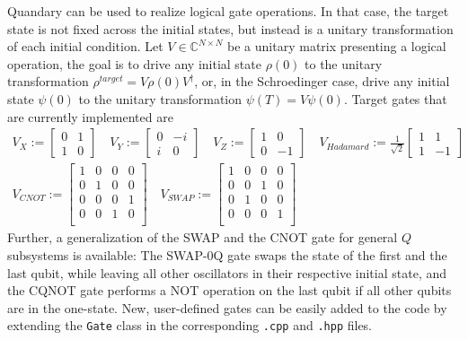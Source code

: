\documentclass[11pt]{article}
\newcommand{\C}{\mathds{C}}
\begin{document}
Quandary can be used to realize logical gate operations. In that case, the target state is not fixed across the initial states, but instead is a unitary transformation of each initial condition. Let $V\in \C^{N\times N}$ be a unitary matrix presenting a logical operation, the goal is to drive any initial state $\rho(0)$ to the unitary transformation $\rho^{target} = V\rho(0)V^{\dagger}$, or, in the Schroedinger case, drive any initial state $\psi(0)$ to the unitary transformation $\psi(T) =  V\psi(0)$.
Target gates that are currently implemented are
\begin{align}
  V_{X} := \begin{bmatrix} 0 & 1 \\ 1 & 0  \end{bmatrix} \quad
  V_{Y} := \begin{bmatrix} 0 & -i \\ i & 0 \end{bmatrix} \quad
  V_{Z} := \begin{bmatrix} 1 & 0 \\ 0 & -1 \end{bmatrix} \quad 
  V_{Hadamard} := \frac{1}{\sqrt{2}} 
           \begin{bmatrix} 1 & 1 \\ 1 & -1 \end{bmatrix} \\
  V_{CNOT} := \begin{bmatrix} 1  & 0 & 0 & 0 \\ 
                               0  & 1 & 0 & 0 \\ 
                               0  & 0 & 0 & 1 \\ 
                               0  & 0 & 1 & 0 \\ 
                \end{bmatrix} \quad 
  V_{SWAP} := \begin{bmatrix}
    1 & 0 & 0 & 0 \\
    0 & 0 & 1 & 0 \\
    0 & 1 & 0 & 0 \\
    0 & 0 & 0 & 1 \\
  \end{bmatrix}
\end{align}
Further, a generalization of the SWAP and the CNOT gate for general $Q$ subsystems is available: The SWAP-0Q gate swaps the state of the first and the last qubit, while leaving all other oscillators in their respective initial state, and the CQNOT gate performs a NOT operation on the last qubit if all other qubits are in the one-state.
New, user-defined gates can be easily added to the code by extending the \texttt{Gate} class in the corresponding \texttt{.cpp} and \texttt{.hpp} files. 
\end{document}
